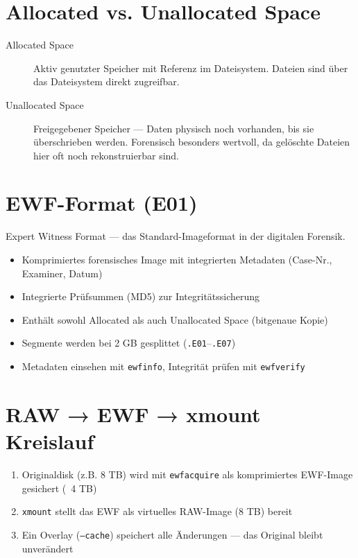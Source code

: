 \section{Allocated vs. Unallocated Space}

\begin{description}
	\item[Allocated Space] Aktiv genutzter Speicher mit Referenz im Dateisystem.
		Dateien sind über das Dateisystem direkt zugreifbar.
	\item[Unallocated Space] Freigegebener Speicher — Daten physisch noch vorhanden, bis sie überschrieben werden.
		Forensisch besonders wertvoll, da gelöschte Dateien hier oft noch rekonstruierbar sind.
\end{description}

\section{EWF-Format (E01)}

Expert Witness Format — das Standard-Imageformat in der digitalen Forensik.

\begin{itemize}
	\item Komprimiertes forensisches Image mit integrierten Metadaten (Case-Nr., Examiner, Datum)
	\item Integrierte Prüfsummen (MD5) zur Integritätssicherung
	\item Enthält sowohl Allocated als auch Unallocated Space (bitgenaue Kopie)
	\item Segmente werden bei 2 GB gesplittet (\texttt{.E01}–\texttt{.E07})
	\item Metadaten einsehen mit \texttt{ewfinfo}, Integrität prüfen mit \texttt{ewfverify}
\end{itemize}

\section{RAW → EWF → xmount Kreislauf}

\begin{enumerate}
	\item Originaldisk (z.B. 8 TB) wird mit \texttt{ewfacquire} als komprimiertes EWF-Image gesichert (~4 TB)
	\item \texttt{xmount} stellt das EWF als virtuelles RAW-Image (8 TB) bereit
	\item Ein Overlay (\texttt{--cache}) speichert alle Änderungen — das Original bleibt unverändert
\end{enumerate}

